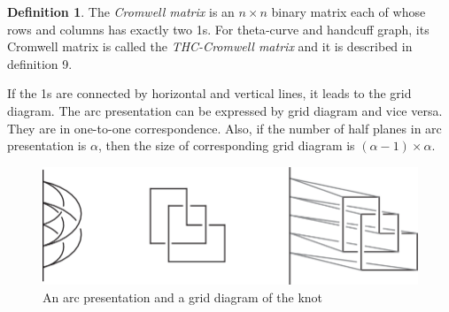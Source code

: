 \documentclass{article}
\theoremstyle{definition}
\newtheorem{defn}[thm]{Definition}
\theoremstyle{theorem}
\theoremstyle{proposition}
\theoremstyle{corollary}
\begin{document}
\begin{defn}
   The \textit{Cromwell matrix} is an $n \times n$ binary matrix each of whose rows and columns has exactly two 1s. 
   For theta‐curve and handcuff graph, its Cromwell matrix is called the \textit{THC-Cromwell matrix} and it is described in definition 9.

If the 1s are connected by horizontal and vertical lines, it leads to the grid diagram. The arc presentation can be expressed by grid diagram and vice versa. They are in one-to-one correspondence. Also, if the number of half planes in arc presentation is $\alpha$, then the size of corresponding grid diagram is $(\alpha - 1) \times \alpha$.\\

\begin{figure}[h]
    \centerline{\includegraphics[width=0.5\linewidth]{An arc presentation and a grid diagram of the knot.png}}
    \caption{An arc presentation and a grid diagram of the knot}
    \label{figure_2}
\end{figure}


\end{defn}
\end{document}
